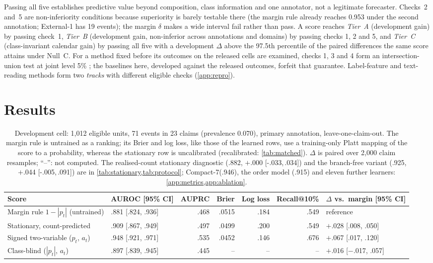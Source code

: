 \documentclass[11pt]{article}
\newcommand{\compact}{Compact-7\xspace}
\newcommand{\ci}[2]{[#1,\,#2]}
\begin{document}
Passing all five establishes predictive value beyond composition, class information and one
annotator, not a legitimate forecaster. Checks~2 and~5 are non-inferiority conditions because
superiority is barely testable there (the margin rule already reaches 0.953 under the second
annotation; External-1 has 19 events); the margin $\delta$ makes a wide interval fail rather than
pass. A score
reaches \emph{Tier~A} (development gain) by passing check~1, \emph{Tier~B} (development gain,
non-inferior across annotations and domains) by passing checks 1, 2 and 5, and
\emph{Tier~C} (class-invariant calendar gain) by passing all five with a development $\Delta$ above
the 97.5th percentile of the paired differences the same score attains under Null~C. For a method fixed before its outcomes on the released cells are examined, checks 1, 3 and 4 form an
intersection-union test at joint level 5\% \citep{Berger1982}; the baselines here, developed
against the released outcomes, forfeit that guarantee. Label-feature and text-reading methods form two \emph{tracks} with different eligible checks (\cref{app:repro}).

\section{Results}
\label{sec:results}
\begin{table}[!t]\centering\scriptsize
\setlength{\tabcolsep}{4pt}
\begin{tabular}{@{}llrrrrl@{}}
\toprule
Score & AUROC [95\% CI] & AUPRC & Brier & Log loss & Recall@10\% & $\Delta$ vs.\ margin [95\% CI] \\
\midrule
Margin rule $1-|p_t|$ (untrained) & .881 [.824, .936] & .468 & .0515 & .184 & .549 & reference \\
Stationary, count-predicted & .909 [.867, .949] & .497 & .0499 & .200 & .549 & $+$.028 [.008, .050] \\
\midrule
Signed two-variable ($p_t$, $a_t$) & .948 [.921, .971] & .535 & .0452 & .146 & .676 & $+$.067 [.017, .120] \\
Class-blind ($|p_t|$, $a_t$) & .897 [.839, .945] & .445 & -- & -- & -- & $+$.016 [$-$.017, .057] \\
\bottomrule
\end{tabular}
\caption{Development cell: 1{,}012 eligible units, 71 events in 23 claims (prevalence 0.070),
primary annotation, leave-one-claim-out. The margin rule is untrained as a ranking; its Brier and
log loss, like those of the learned rows, use a training-only Platt mapping \citep{Platt1999} of the
score to a probability, whereas the stationary row is uncalibrated (recalibrated: \cref{tab:matched}).
$\Delta$ is paired over 2{,}000 claim resamples; ``--'': not computed. The realised-count stationary
diagnostic (.882, $+$.000 \ci{-.033}{.034}) and the branch-free variant (.925, $+$.044
\ci{-.005}{.091}) are in \cref{tab:stationary,tab:protocol}; \compact (.946), the order
model (.915) and eleven further learners: \cref{app:metrics,app:ablation}.}
\label{tab:core}
\end{table}
\end{document}
